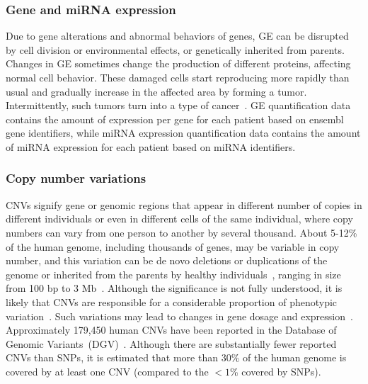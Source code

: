 \subsubsection{Gene and miRNA expression}
Due to  gene alterations and abnormal behaviors of genes, GE can be disrupted by cell division or environmental effects, or genetically inherited from parents. Changes in GE sometimes change the production of different proteins, affecting normal cell behavior. These damaged cells start reproducing more rapidly than usual and gradually increase in the affected area by forming a tumor. Intermittently, such tumors turn into a type of cancer~\cite{zuo2019identification,24Podolsky}. GE quantification data contains the amount of expression per gene for each patient based on ensembl gene identifiers, while miRNA expression quantification data contains the amount of miRNA expression for each patient based on miRNA identifiers.

\subsubsection{Copy number variations}
\label{sec:cnv_data}
CNVs signify gene or genomic regions that appear in different number of copies in different individuals or even in different cells of the same individual, where copy numbers can vary from one person to another by several thousand. About 5-12\% of the human genome, including thousands of genes, may be variable in copy number, and this variation can be de novo deletions or duplications of the genome or inherited from the parents by healthy individuals~\cite{ostrovnaya2010classification}, ranging in size from 100 bp to 3 Mb~\cite{zhang2006development}. Although the significance is not fully understood, it is likely that CNVs are responsible for a considerable proportion of phenotypic variation~\cite{ostrovnaya2010classification}. Such variations may lead to changes in gene dosage and expression~\cite{diskin2009copy}. Approximately 179,450 human CNVs have been reported in the Database of Genomic Variants~(DGV)~\cite{iafrate2004detection,zhang2006development}. Although there are substantially fewer reported CNVs than SNPs, it is estimated that more than 30\% of the human genome is covered by at least one CNV (compared to the $<1$\% covered by SNPs). 

